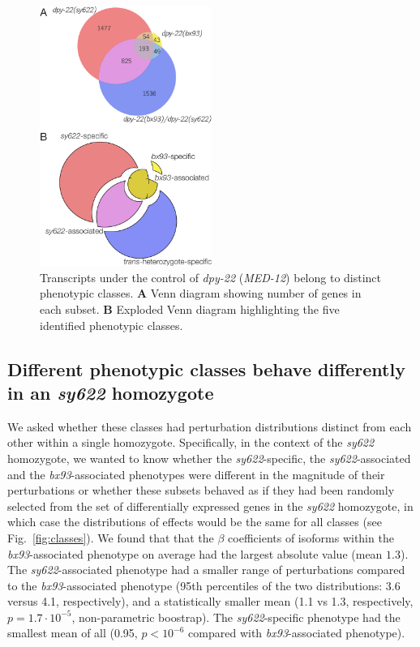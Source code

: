 \documentclass[10pt, twocolumn]{article}
\newcommand{\gene}[1]{\mbox{\emph{#1}}}
\newcommand{\dpy}{\gene{dpy-22} (\emph{MED-12})}
\begin{document}
\begin{figure}
  \includegraphics[width=0.5\textwidth]{../figs/venn_diagrams.pdf}
  \caption{
  Transcripts under the control of \dpy{} belong to distinct phenotypic
  classes.
  \textbf{A} Venn diagram showing number of genes in each subset.
  \textbf{B} Exploded Venn diagram highlighting the five identified phenotypic
  classes.
  }
\label{fig:venn}
\end{figure}

\subsection*{Different phenotypic classes behave differently in an
            \emph{sy622} homozygote}
We asked whether these classes had perturbation distributions distinct from each
other within a single homozygote. Specifically, in the context of the
\emph{sy622} homozygote, we wanted to know whether the \emph{sy622}-specific,
the \emph{sy622}-associated and the \emph{bx93}-associated phenotypes were
different in the magnitude of their perturbations or whether these subsets
behaved as if they had been randomly selected from the set of differentially
expressed genes in the \emph{sy622} homozygote, in which case the distributions
of effects would be the same for all classes (see Fig.~\ref{fig:classes}). We
found that that the $\beta$ coefficients of isoforms within the
\emph{bx93}-associated phenotype on average had the largest absolute value (mean
$1.3$). The \emph{sy622}-associated phenotype had a smaller range of
perturbations compared to the \emph{bx93}-associated phenotype (95th percentiles
of the two distributions: 3.6 versus 4.1, respectively), and a statistically
smaller mean (1.1 vs 1.3, respectively, $p = 1.7 \cdot 10^{-5}$, non-parametric
boostrap). The \emph{sy622}-specific phenotype had the smallest mean of all
(0.95, $p < 10^{-6}$ compared with \emph{bx93}-associated phenotype).
\end{document}
